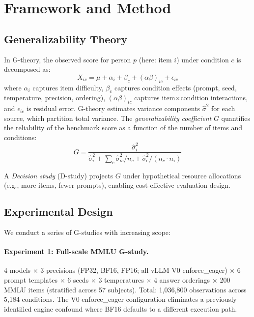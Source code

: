 \documentclass[11pt,twocolumn]{article}
\begin{document}
\section{Framework and Method}

\subsection{Generalizability Theory}

In G-theory, the observed score for person $p$ (here: item $i$) under condition $c$ is decomposed as:
\begin{equation}
X_{ic} = \mu + \alpha_i + \beta_c + (\alpha\beta)_{ic} + \epsilon_{ic}
\end{equation}
where $\alpha_i$ captures item difficulty, $\beta_c$ captures condition effects (prompt, seed, temperature, precision, ordering), $(\alpha\beta)_{ic}$ captures item$\times$condition interactions, and $\epsilon_{ic}$ is residual error. G-theory estimates variance components $\hat{\sigma}^2$ for each source, which partition total variance. The \emph{generalizability coefficient} $G$ quantifies the reliability of the benchmark score as a function of the number of items and conditions:
\begin{equation}
G = \frac{\hat{\sigma}^2_i}{\hat{\sigma}^2_i + \sum_c \hat{\sigma}^2_{ic}/n_c + \hat{\sigma}^2_\epsilon / (n_c \cdot n_i)}
\end{equation}

A \emph{Decision study} (D-study) projects $G$ under hypothetical resource allocations (e.g., more items, fewer prompts), enabling cost-effective evaluation design.

\subsection{Experimental Design}

We conduct a series of G-studies with increasing scope:

\paragraph{Experiment 1: Full-scale MMLU G-study.} 4 models $\times$ 3 precisions (FP32, BF16, FP16; all vLLM V0 enforce\_eager) $\times$ 6 prompt templates $\times$ 6 seeds $\times$ 3 temperatures $\times$ 4 answer orderings $\times$ 200 MMLU items (stratified across 57 subjects). Total: 1,036,800 observations across 5,184 conditions. The V0 enforce\_eager configuration eliminates a previously identified engine confound where BF16 defaults to a different execution path.
\end{document}
